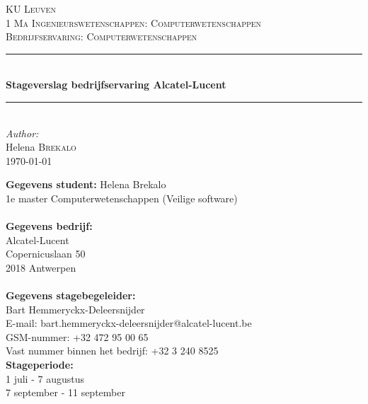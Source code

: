 \documentclass[10pt,a4paper]{article}
\begin{document}
\begin{titlepage}

\newcommand{\HRule}{\rule{\linewidth}{0.5mm}} %

\center %
 
\textsc{\LARGE KU Leuven}\\[1.5cm] %
\textsc{\Large 1 Ma Ingenieurswetenschappen: Computerwetenschappen}\\[0.5cm] %
\textsc{\large Bedrijfservaring: Computerwetenschappen}\\[0.5cm] %


\HRule \\[0.4cm]
{ \huge \bfseries Stageverslag bedrijfservaring Alcatel-Lucent}\\[0.4cm]
\HRule \\[1.5cm]
 

\Large \emph{Author:}\\
Helena \textsc{Brekalo}\\[3cm]

{\large \today}\\[3cm] %

\vfill %

\end{titlepage}

\textbf{Gegevens student:}
Helena Brekalo\\
1e master Computerwetenschappen (Veilige software)\\
\medskip
\\
\textbf{Gegevens bedrijf:}\\
Alcatel-Lucent\\
Copernicuslaan 50\\
2018 Antwerpen\\
\medskip
\\
\textbf{Gegevens stagebegeleider:}\\
Bart Hemmeryckx-Deleersnijder\\
E-mail: bart.hemmeryckx-deleersnijder@alcatel-lucent.be\\
GSM-nummer: +32 472 95 00 65\\
Vast nummer binnen het bedrijf: +32 3 240 8525
\medskip
\\
\textbf{Stageperiode:}\\
1 juli - 7 augustus\\
7 september - 11 september
\clearpage
\end{document}
